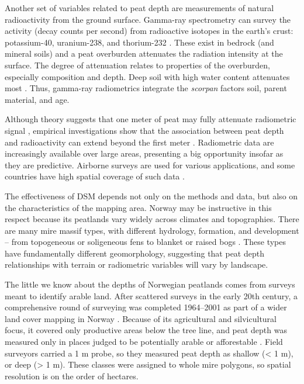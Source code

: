 \documentclass[soil, manuscript]{copernicus}
\begin{document}
Another set of variables related to peat depth are measurements of natural radioactivity from the ground surface.
Gamma-ray spectrometry can survey the activity (decay counts per second) from radioactive isotopes in the earth's crust: potassium-40, uranium-238, and thorium-232 \citep{reinhardtGammaraySpectrometryVersatile2019}.
These exist in bedrock (and mineral soils) and a peat overburden attenuates the radiation intensity at the surface.
The degree of attenuation relates to properties of the overburden, especially composition and depth.
Deep soil with high water content attenuates most \citep{beamishGammaRayAttenuation2013, reinhardtGammaraySpectrometryVersatile2019}.
Thus, gamma-ray radiometrics integrate the \emph{scorpan} factors soil, parent material, and age.

Although theory suggests that one meter of peat may fully attenuate radiometric signal \citep{beamishGammaRayAttenuation2013, reinhardtGammaraySpectrometryVersatile2019}, empirical investigations show that the association between peat depth and radioactivity can extend beyond the first meter \citep{keaneySpatialStatisticsEstimate2013, gatisMappingUplandPeat2019, kogantiMappingPeatDepth2023}.
Radiometric data are increasingly available over large areas, presenting a big opportunity insofar as they are predictive.
Airborne surveys are used for various applications, and some countries have high spatial coverage of such data \citep{minasnyDigitalMappingPeatlands2019, baranwalAirborneGeophysicalSurveys2020}.

The effectiveness of DSM depends not only on the methods and data, but also on the characteristics of the mapping area.
Norway may be instructive in this respect because its peatlands vary widely across climates and topographies. There are many mire massif types, with different hydrology, formation, and development -- from topogeneous or soligeneous fens to blanket or raised bogs \citep{lyngstadBeskrivelserAvTorvmassivenheter2023}.
These types have fundamentally different geomorphology, suggesting that peat depth relationships with terrain or radiometric variables will vary by landscape.

The little we know about the depths of Norwegian peatlands comes from surveys meant to identify arable land.
After scattered surveys in the early 20th century, a comprehensive round of surveying was completed 1964--2001 as part of a wider land cover mapping in Norway \citep{bjordalMarkslagsklassifikasjonOkonomiskKartverk2007}.
Because of its agricultural and silvicultural focus, it covered only productive areas below the tree line, and peat depth was measured only in places judged to be potentially arable or afforestable \citep{ahlstromAR5Klassifikasjonssystem2019}.
Field surveyors carried a 1 m probe, so they measured peat depth as shallow (\textless{} 1 m), or deep (\textgreater{} 1 m).
These classes were assigned to whole mire polygons, so spatial resolution is on the order of hectares.
\end{document}
